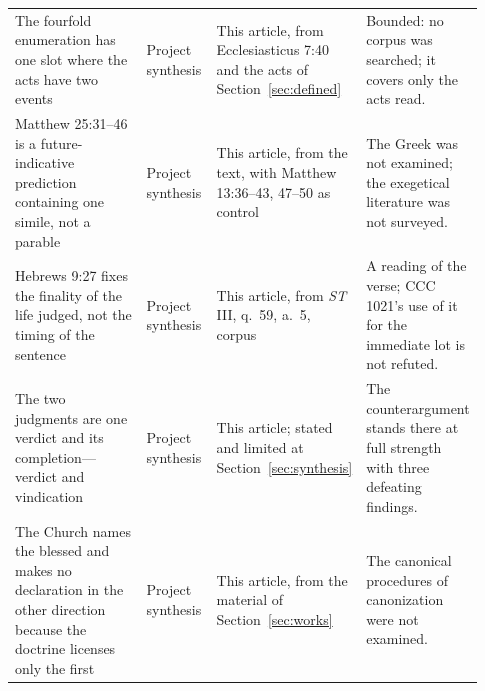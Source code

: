 \begin{longtable}{>{\raggedright\arraybackslash}p{0.30\linewidth}>{\raggedright\arraybackslash}p{0.15\linewidth}>{\raggedright\arraybackslash}p{0.26\linewidth}>{\raggedright\arraybackslash}p{0.22\linewidth}}
The fourfold enumeration has one slot where the acts have two events & Project synthesis & This article, from Ecclesiasticus 7:40 and the acts of Section~\ref{sec:defined} & Bounded: no corpus was searched; it covers only the acts read.\\
Matthew 25:31--46 is a future-indicative prediction containing one simile, not a parable & Project synthesis & This article, from the text, with Matthew 13:36--43, 47--50 as control & The Greek was not examined; the exegetical literature was not surveyed.\\
Hebrews 9:27 fixes the finality of the life judged, not the timing of the sentence & Project synthesis & This article, from \emph{ST} III, q.~59, a.~5, corpus & A reading of the verse; CCC 1021's use of it for the immediate lot is not refuted.\\
The two judgments are one verdict and its completion---verdict and vindication & Project synthesis & This article; stated and limited at Section~\ref{sec:synthesis} & The counterargument stands there at full strength with three defeating findings.\\
The Church names the blessed and makes no declaration in the other direction because the doctrine licenses only the first & Project synthesis & This article, from the material of Section~\ref{sec:works} & The canonical procedures of canonization were not examined.\\
\end{longtable}
\endgroup
